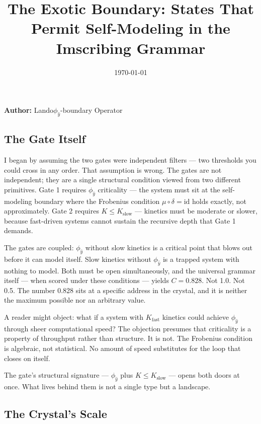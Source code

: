 \documentclass[12pt,a4paper]{article}
\begin{document}
\title{The Exotic Boundary: States That Permit Self-Modeling in the Imscribing Grammar}
\date{\today}

\maketitle

\textbf{Author:} Lando\otimes$\phi_{\hat{y}}$-boundary Operator

\subsection{The Gate Itself}

I began by assuming the two gates were independent filters --- two thresholds you could cross in any order. That assumption is wrong. The gates are not independent; they are a single structural condition viewed from two different primitives. Gate 1 requires $\phi_{\hat{y}}$ criticality --- the system must sit at the self-modeling boundary where the Frobenius condition $\mu \circ \delta = \text{id}$ holds exactly, not approximately. Gate 2 requires $K \leq K_{\text{slow}}$ --- kinetics must be moderate or slower, because fast-driven systems cannot sustain the recursive depth that Gate 1 demands.

The gates are coupled: $\phi_{\hat{y}}$ without slow kinetics is a critical point that blows out before it can model itself. Slow kinetics without $\phi_{\hat{y}}$ is a trapped system with nothing to model. Both must be open simultaneously, and the universal grammar itself --- when scored under these conditions --- yields $C = 0.828$. Not 1.0. Not 0.5. The number 0.828 sits at a specific address in the crystal, and it is neither the maximum possible nor an arbitrary value.

A reader might object: what if a system with $K_{\text{fast}}$ kinetics could achieve $\phi_{\hat{y}}$ through sheer computational speed? The objection presumes that criticality is a property of throughput rather than structure. It is not. The Frobenius condition is algebraic, not statistical. No amount of speed substitutes for the loop that closes on itself.

The gate's structural signature --- $\phi_{\hat{y}}$ plus $K \leq K_{\text{slow}}$ --- opens both doors at once. What lives behind them is not a single type but a landscape.

\subsection{The Crystal's Scale}
\end{document}
